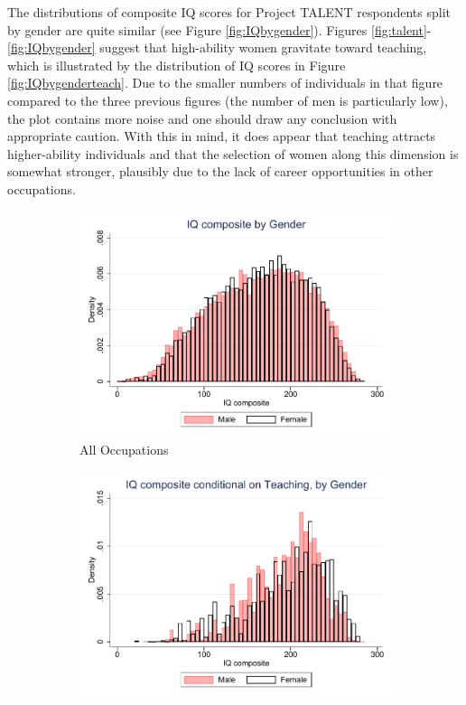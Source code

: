 \documentclass[onehalfspacing,11pt]{article}
\begin{document}
	The distributions of composite IQ scores for Project TALENT respondents split by gender are quite similar (see Figure \ref{fig:IQbygender}). Figures \ref{fig:talent}-\ref{fig:IQbygender} suggest that high-ability women gravitate toward teaching, which is illustrated by the distribution of IQ scores in Figure \ref{fig:IQbygenderteach}. Due to the smaller numbers of individuals in that figure compared to the three previous figures (the number of men is particularly low), the plot contains more noise and one should draw any conclusion with appropriate caution. With this in mind, it does appear that teaching attracts higher-ability individuals and that the selection of women along this dimension is somewhat stronger, plausibly due to the lack of career opportunities in other occupations.
	
	\begin{figure}
		\begin{subfigure}{0.49\textwidth}
			\includegraphics[width=\linewidth]{iq_by_gender.pdf}
			\caption{All Occupations}
			\label{fig:IQbygenderall}
		\end{subfigure}	
		\hspace*{\fill} %
		\begin{subfigure}{0.49\textwidth}
			\includegraphics[width=\linewidth]{iq_by_gen_teach.pdf}

\end{subfigure}
\end{figure}
\end{document}
